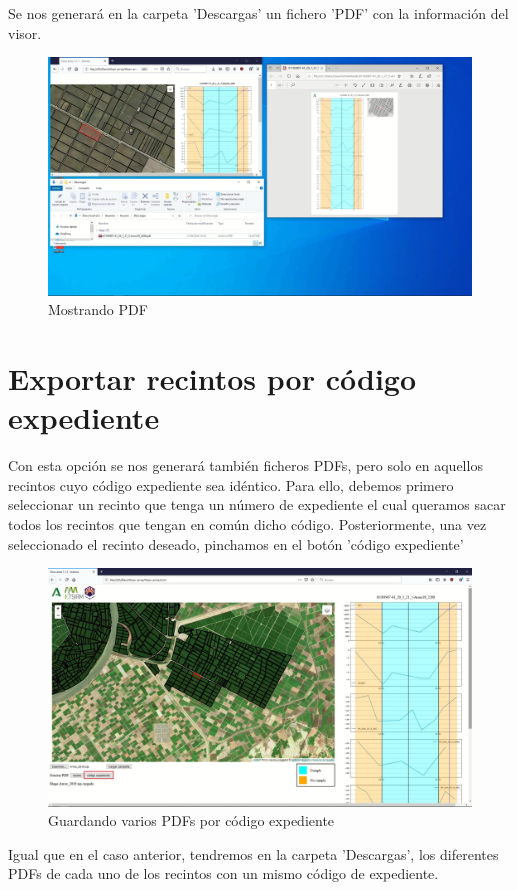 \documentclass{article}
\begin{document}
Se nos generará en la carpeta 'Descargas' un fichero 'PDF' con la información del visor.

\begin{figure}[H]
	\centering
	\includegraphics[width=0.8\linewidth]{pdf.jpg}
	\caption{Mostrando PDF}
	\label{fig:pdf}
\end{figure}

\section{Exportar recintos por código expediente}

Con esta opción se nos generará también ficheros PDFs, pero solo en aquellos recintos cuyo código expediente sea idéntico. Para ello, debemos primero seleccionar un recinto que tenga un número de expediente el cual queramos sacar todos los recintos que tengan en común dicho código. Posteriormente, una vez seleccionado el recinto deseado, pinchamos en el botón 'código expediente'

\begin{figure}[H]
	\centering
	\includegraphics[width=0.8\linewidth]{codexp.jpg}
	\caption{Guardando varios PDFs por código expediente}
	\label{fig:codexp}
\end{figure}

Igual que en el caso anterior, tendremos en la carpeta 'Descargas', los diferentes PDFs de cada uno de los recintos con un mismo código de expediente.
\end{document}
